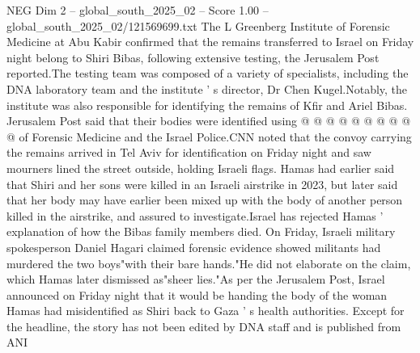 \begin{textsample}{NEG Dim 2 – global\_south\_2025\_02 – Score 1.00 – global\_south\_2025\_02/121569699.txt}
The L Greenberg Institute of Forensic Medicine at Abu Kabir confirmed that the remains transferred to Israel on Friday night belong to Shiri Bibas, following extensive testing, the Jerusalem Post reported.The testing team was composed of a variety of specialists, including the DNA laboratory team and the institute ' s director, Dr Chen Kugel.Notably, the institute was also responsible for identifying the remains of Kfir and Ariel Bibas.
Jerusalem Post said that their bodies were identified using @ @ @ @ @ @ @ @ @ @ of Forensic Medicine and the Israel Police.CNN noted that the convoy carrying the remains arrived in Tel Aviv for identification on Friday night and saw mourners lined the street outside, holding Israeli flags.
Hamas had earlier said that Shiri and her sons were killed in an Israeli airstrike in 2023, but later said that her body may have earlier been mixed up with the body of another person killed in the airstrike, and assured to investigate.Israel has rejected Hamas ' explanation of how the Bibas family members died.
On Friday, Israeli military spokesperson Daniel Hagari claimed forensic evidence showed militants had murdered the two boys"with their bare hands."He did not elaborate on the claim, which Hamas later dismissed as"sheer lies."As per the Jerusalem Post, Israel announced on Friday night that it would be handing the body of the woman Hamas had misidentified as Shiri back to Gaza ' s health authorities.
Except for the headline, the story has not been edited by DNA staff and is published from ANI

\end{textsample}
